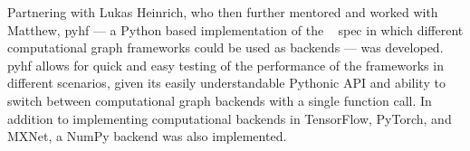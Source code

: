 Partnering with Lukas Heinrich, who then further mentored and worked with Matthew, pyhf --- a Python based implementation of the ~\cite{Cranmer:2012sba} spec in which different computational graph frameworks could be used as backends --- was developed.
pyhf allows for quick and easy testing of the performance of the frameworks in different scenarios, given its easily understandable Pythonic API and ability to switch between computational graph backends with a single function call.
In addition to implementing computational backends in TensorFlow, PyTorch, and MXNet, a NumPy backend was also implemented.\\

